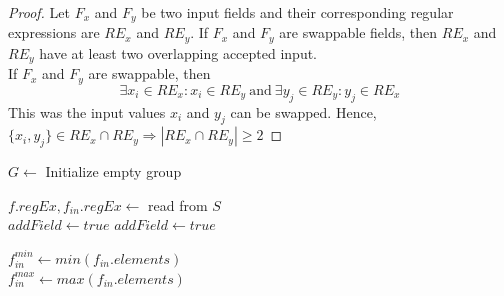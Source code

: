 \begin{proof}
  Let $F_x$ and $F_y$ be two input fields and their corresponding regular expressions are $RE_x$ and $RE_y$. If $F_x$ and $F_y$ are swappable fields, then $RE_x$ and $RE_y$ have at least two overlapping accepted input.
  \\
  If $F_x$ and $F_y$ are swappable, then 
  $$\exists x_i \in RE_x : x_i \in RE_y\ \text{and}\ \exists y_j \in RE_y : y_j \in RE_x$$ 
  This was the input values $x_i$ and $y_j$ can be swapped.
  Hence, $\{x_i, y_j\} \in RE_x \cap RE_y \Rightarrow |RE_x \cap RE_y| \geq 2$ 
\end{proof}

\begin{algorithm}[h]
\small
\DontPrintSemicolon
{}
    $G\leftarrow$ Initialize empty group\\
     {
         {
                $f.regEx, f_{in}.regEx \leftarrow$ read from $S$\\        
                 {       
                     {  \label{algo:makeGroup:regEx}   
                        $addField \leftarrow true$ 
                     }
                      { 
                             { \label{algo:makeGroup:member} 
                             $addField \leftarrow true$ 
                         }
                     }  
                }
                 {
                     {\label{algo:makeGroup:menuNum} 
                    
                        $f_{in}^{min} \leftarrow min(f_{in}.elements)$\\
                        $f_{in}^{max} \leftarrow max(f_{in}.elements)$\\
                    }
                    
}}}
\end{algorithm}

